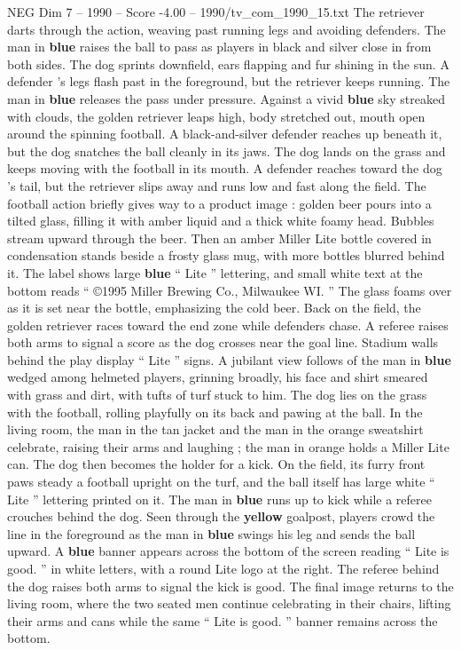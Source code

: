 \begin{textsample}{NEG Dim 7 – 1990 – Score -4.00 – 1990/tv\_com\_1990\_15.txt}
The retriever darts through the action, weaving past running legs and avoiding defenders.
The man in \textbf{blue} raises the ball to pass as players in black and silver close in from both sides.
The dog sprints downfield, ears flapping and fur shining in the sun.
A defender ’s legs flash past in the foreground, but the retriever keeps running.
The man in \textbf{blue} releases the pass under pressure.
Against a vivid \textbf{blue} sky streaked with clouds, the golden retriever leaps high, body stretched out, mouth open around the spinning football.
A black-and-silver defender reaches up beneath it, but the dog snatches the ball cleanly in its jaws.
The dog lands on the grass and keeps moving with the football in its mouth.
A defender reaches toward the dog ’s tail, but the retriever slips away and runs low and fast along the field.
The football action briefly gives way to a product image : golden beer pours into a tilted glass, filling it with amber liquid and a thick white foamy head.
Bubbles stream upward through the beer.
Then an amber Miller Lite bottle covered in condensation stands beside a frosty glass mug, with more bottles blurred behind it.
The label shows large \textbf{blue} “ Lite ” lettering, and small white text at the bottom reads “ {\EmojiFont ©}1995 Miller Brewing Co., Milwaukee WI. ” The glass foams over as it is set near the bottle, emphasizing the cold beer.
Back on the field, the golden retriever races toward the end zone while defenders chase.
A referee raises both arms to signal a score as the dog crosses near the goal line.
Stadium walls behind the play display “ Lite ” signs.
A jubilant view follows of the man in \textbf{blue} wedged among helmeted players, grinning broadly, his face and shirt smeared with grass and dirt, with tufts of turf stuck to him.
The dog lies on the grass with the football, rolling playfully on its back and pawing at the ball.
In the living room, the man in the tan jacket and the man in the orange sweatshirt celebrate, raising their arms and laughing ; the man in orange holds a Miller Lite can.
The dog then becomes the holder for a kick.
On the field, its furry front paws steady a football upright on the turf, and the ball itself has large white “ Lite ” lettering printed on it.
The man in \textbf{blue} runs up to kick while a referee crouches behind the dog.
Seen through the \textbf{yellow} goalpost, players crowd the line in the foreground as the man in \textbf{blue} swings his leg and sends the ball upward.
A \textbf{blue} banner appears across the bottom of the screen reading “ Lite is good. ” in white letters, with a round Lite logo at the right.
The referee behind the dog raises both arms to signal the kick is good.
The final image returns to the living room, where the two seated men continue celebrating in their chairs, lifting their arms and cans while the same “ Lite is good. ” banner remains across the bottom.

\end{textsample}
